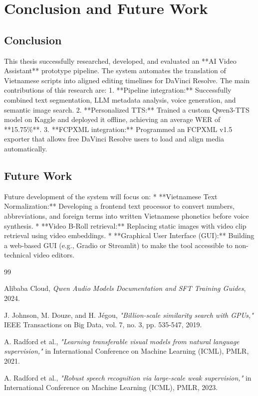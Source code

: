 \documentclass[a4paper,12pt]{report}
\begin{document}
\chapter{Conclusion and Future Work}
\label{ch:conclusion}

\section{Conclusion}
This thesis successfully researched, developed, and evaluated an **AI Video Assistant** prototype pipeline. The system automates the translation of Vietnamese scripts into aligned editing timelines for DaVinci Resolve. The main contributions of this research are:
1. **Pipeline integration:** Successfully combined text segmentation, LLM metadata analysis, voice generation, and semantic image search.
2. **Personalized TTS:** Trained a custom Qwen3-TTS model on Kaggle and deployed it offline, achieving an average WER of **15.75\%**.
3. **FCPXML integration:** Programmed an FCPXML v1.5 exporter that allows free DaVinci Resolve users to load and align media automatically.

\section{Future Work}
Future development of the system will focus on:
* **Vietnamese Text Normalization:** Developing a frontend text processor to convert numbers, abbreviations, and foreign terms into written Vietnamese phonetics before voice synthesis.
* **Video B-Roll retrieval:** Replacing static images with video clip retrieval using video embeddings.
* **Graphical User Interface (GUI):** Building a web-based GUI (e.g., Gradio or Streamlit) to make the tool accessible to non-technical video editors.

\begin{thebibliography}{99}

Alibaba Cloud, \textit{Qwen Audio Models Documentation and SFT Training Guides}, 2024.

J. Johnson, M. Douze, and H. Jégou, \textit{"Billion-scale similarity search with GPUs,"} IEEE Transactions on Big Data, vol. 7, no. 3, pp. 535-547, 2019.

A. Radford et al., \textit{"Learning transferable visual models from natural language supervision,"} in International Conference on Machine Learning (ICML), PMLR, 2021.

A. Radford et al., \textit{"Robust speech recognition via large-scale weak supervision,"} in International Conference on Machine Learning (ICML), PMLR, 2023.

\end{thebibliography}
\end{document}
